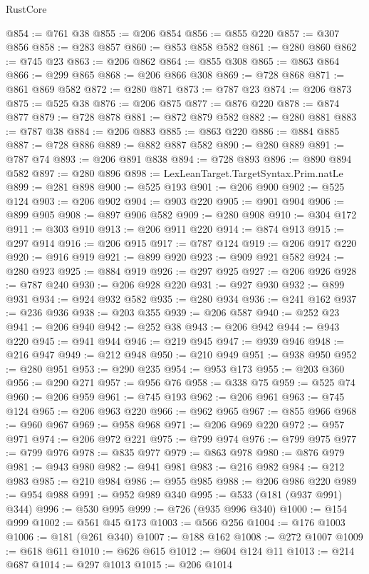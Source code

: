 \begin{lexlean}{RustCore}
\begin{coremodule}
@854 := @761 @38
@855 := @206 @854
@856 := @855 @220
@857 := @307 @856
@858 := @283 @857
@860 := @853 @858 @582
@861 := @280 @860
@862 := @745 @23
@863 := @206 @862
@864 := @855 @308
@865 := @863 @864
@866 := @299 @865
@868 := @206 @866 @308
@869 := @728 @868
@871 := @861 @869 @582
@872 := @280 @871
@873 := @787 @23
@874 := @206 @873
@875 := @525 @38
@876 := @206 @875
@877 := @876 @220
@878 := @874 @877
@879 := @728 @878
@881 := @872 @879 @582
@882 := @280 @881
@883 := @787 @38
@884 := @206 @883
@885 := @863 @220
@886 := @884 @885
@887 := @728 @886
@889 := @882 @887 @582
@890 := @280 @889
@891 := @787 @74
@893 := @206 @891 @838
@894 := @728 @893
@896 := @890 @894 @582
@897 := @280 @896
@898 := LexLeanTarget.TargetSyntax.Prim.natLe
@899 := @281 @898
@900 := @525 @193
@901 := @206 @900
@902 := @525 @124
@903 := @206 @902
@904 := @903 @220
@905 := @901 @904
@906 := @899 @905
@908 := @897 @906 @582
@909 := @280 @908
@910 := @304 @172
@911 := @303 @910
@913 := @206 @911 @220
@914 := @874 @913
@915 := @297 @914
@916 := @206 @915
@917 := @787 @124
@919 := @206 @917 @220
@920 := @916 @919
@921 := @899 @920
@923 := @909 @921 @582
@924 := @280 @923
@925 := @884 @919
@926 := @297 @925
@927 := @206 @926
@928 := @787 @240
@930 := @206 @928 @220
@931 := @927 @930
@932 := @899 @931
@934 := @924 @932 @582
@935 := @280 @934
@936 := @241 @162
@937 := @236 @936
@938 := @203 @355
@939 := @206 @587
@940 := @252 @23
@941 := @206 @940
@942 := @252 @38
@943 := @206 @942
@944 := @943 @220
@945 := @941 @944
@946 := @219 @945
@947 := @939 @946
@948 := @216 @947
@949 := @212 @948
@950 := @210 @949
@951 := @938 @950
@952 := @280 @951
@953 := @290 @235
@954 := @953 @173
@955 := @203 @360
@956 := @290 @271
@957 := @956 @76
@958 := @338 @75
@959 := @525 @74
@960 := @206 @959
@961 := @745 @193
@962 := @206 @961
@963 := @745 @124
@965 := @206 @963 @220
@966 := @962 @965
@967 := @855 @966
@968 := @960 @967
@969 := @958 @968
@971 := @206 @969 @220
@972 := @957 @971
@974 := @206 @972 @221
@975 := @799 @974
@976 := @799 @975
@977 := @799 @976
@978 := @835 @977
@979 := @863 @978
@980 := @876 @979
@981 := @943 @980
@982 := @941 @981
@983 := @216 @982
@984 := @212 @983
@985 := @210 @984
@986 := @955 @985
@988 := @206 @986 @220
@989 := @954 @988
@991 := @952 @989 @340
@995 := @533 (@181 (@937 @991) @344)
@996 := @530 @995
@999 := @726 (@935 @996 @340)
@1000 := @154 @999
@1002 := @561 @45 @173
@1003 := @566 @256
@1004 := @176 @1003
@1006 := @181 (@261 @340)
@1007 := @188 @162
@1008 := @272 @1007
@1009 := @618 @611
@1010 := @626 @615
@1012 := @604 @124 @11
@1013 := @214 @687
@1014 := @297 @1013
@1015 := @206 @1014

\end{coremodule}
\end{lexlean}
